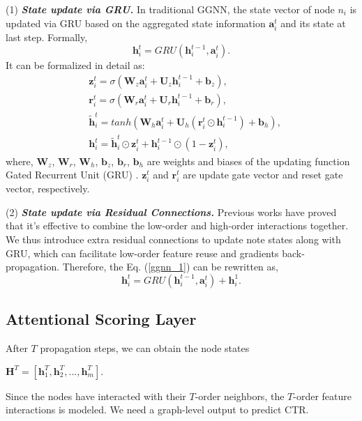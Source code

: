 \documentclass[sigconf]{acmart}
\begin{document}
(1) \textit{\textbf{State update via GRU.}}
In traditional GGNN, the state vector of node $n_{i}$ is updated via GRU based on the aggregated state information $\mathbf{a}_{i}^{t}$ and its state at last step.
Formally, 
\begin{equation} \label{ggnn_1}
\mathbf{h}_{i}^{t} = GRU(\mathbf{h}_{i}^{t-1}, \mathbf{a}_{i}^{t}).
\end{equation}
It can be formalized in detail as:
\begin{align}
& \mathbf{z}_{i}^{t} =  \sigma(\mathbf{W}_{z} \mathbf{a}_{i}^{t} + \mathbf{U}_{z}\mathbf{h}_{i}^{t-1} + \mathbf{b}_{z}),\\
& \mathbf{r}_{i}^{t} =  \sigma(\mathbf{W}_{r} \mathbf{a}_{i}^{t} + \mathbf{U}_{r}\mathbf{h}_{i}^{t-1} + \mathbf{b}_{r}),\\
& \mathbf{\tilde{h}}_{i}^{t} =  tanh(\mathbf{W}_{h} \mathbf{a}_{i}^{t} + \mathbf{U}_{h}(\mathbf{r}_{i}^{t} \odot \mathbf{h}_{i}^{t-1}) + \mathbf{b}_{h}), \\
& \mathbf{h}_{i}^{t} = \mathbf{\tilde{h}}_{i}^{t} \odot \mathbf{z}_{i}^{t} + \mathbf{h}_{i}^{t-1} \odot (1-\mathbf{z}_{i}^{t}),~
\end{align}
where, $\mathbf{W}_{z}$, $\mathbf{W}_{r}$, $\mathbf{W}_{h}$, $\mathbf{b}_{z}$, $\mathbf{b}_{r}$, $\mathbf{b}_{h}$ are weights and biases of the updating function Gated Recurrent Unit (GRU) \cite{li2015gated}. 
$\mathbf{z}_{i}^{t}$ and $\mathbf{r}_{i}^{t}$ are update gate vector and reset gate vector, respectively.


(2) \textit{\textbf{State update via Residual Connections.}}
Previous works \cite{shan2016deep,song2018autoint,cheng2016wide} have proved that it's effective to combine the low-order and high-order interactions together.
We thus introduce extra residual connections to update note states along with GRU, which can facilitate low-order feature reuse and gradients back-propagation.
Therefore, the Eq. (\ref{ggnn_1}) can be rewritten as, 
\begin{equation} \label{eq:residual}
\mathbf{h}_{i}^{t} = GRU(\mathbf{h}_{i}^{t-1}, \mathbf{a}_{i}^{t}) + \mathbf{h}_{i}^{1}.
\end{equation}



\subsection{Attentional Scoring Layer}
After $T$ propagation steps, we can obtain the node states
\begin{center}
$\mathbf{H}^{T} = \left [ \mathbf{h}_{1}^{T}, \mathbf{h}_{2}^{T}, ... , \mathbf{h}_{m}^{T} \right ].$
\end{center}
Since the nodes have interacted with their $T$-order neighbors, the $T$-order feature interactions is modeled.
We need a graph-level output to predict CTR.
\end{document}
